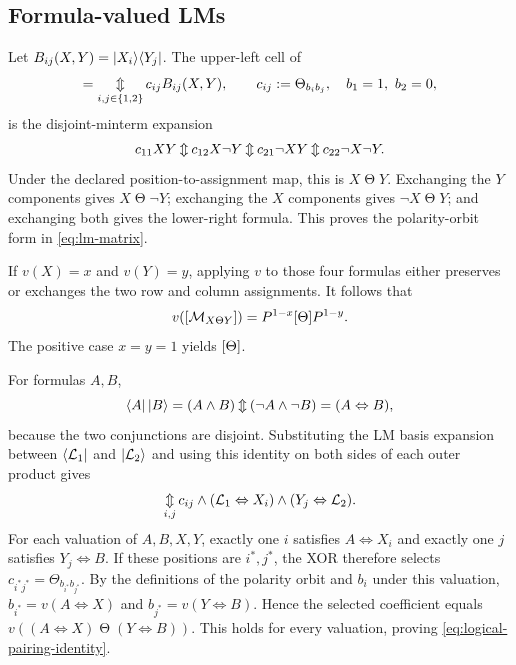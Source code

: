 \subsection{Formula-valued LMs}

Let $B_{ij}(X,Y)=\left|X_i\right\rangle\!\left\langle Y_j\right|$. The upper-left cell of
\begin{equation}
  [\mathcal{M}_{X\Theta Y}]
  =\mathop{\XOR}_{i,j\in\{1,2\}}c_{ij}B_{ij}(X,Y),
  \qquad c_{ij}:=\Theta_{b_i b_j},\quad b_1=1,\ b_2=0,
\end{equation}
is the disjoint-minterm expansion
\begin{equation}
  c_{11}XY
  \mathbin{\Updownarrow} c_{12}X\neg Y
  \mathbin{\Updownarrow} c_{21}\neg X Y
  \mathbin{\Updownarrow} c_{22}\neg X\neg Y.
\end{equation}
Under the declared position-to-assignment map, this is
$X\mathbin{\Theta}Y$. Exchanging the $Y$ components gives
$X\mathbin{\Theta}\neg Y$; exchanging the $X$ components gives
$\neg X\mathbin{\Theta}Y$; and exchanging both gives the lower-right
formula. This proves the polarity-orbit form in \eqref{eq:lm-matrix}.

If $v(X)=x$ and $v(Y)=y$, applying $v$ to those four formulas either preserves
or exchanges the two row and column assignments. It follows that
\begin{equation}
  v([\mathcal{M}_{X\Theta Y}])
  =P^{1-x}[\Theta]P^{1-y}.
\end{equation}
The positive case $x=y=1$ yields $[\Theta]$.

For formulas $A,B$,
\begin{equation}
  \left\langle A\right|\left|B\right\rangle
  =(A\wedge B)\mathbin{\Updownarrow}(\neg A\wedge\neg B)
  =(A\Leftrightarrow B),
\end{equation}
because the two conjunctions are disjoint. Substituting the LM basis expansion
between $\left\langle\mathcal L_1\right|$ and $\left|\mathcal L_2\right\rangle$ and using this
identity on both sides of each outer product gives
\begin{equation}
  \mathop{\mathbin{\Updownarrow}}_{i,j}
    c_{ij}\wedge(\mathcal L_1\Leftrightarrow X_i)
    \wedge(Y_j\Leftrightarrow\mathcal L_2).
\end{equation}
For each valuation of $A,B,X,Y$, exactly one $i$ satisfies
$A\Leftrightarrow X_i$ and exactly one $j$ satisfies
$Y_j\Leftrightarrow B$. If these positions are $i^*,j^*$, the XOR therefore
selects $c_{i^*j^*}=\Theta_{b_{i^*}b_{j^*}}$. By the definitions of the
polarity orbit and $b_i$ under this valuation,
$b_{i^*}=v(A\Leftrightarrow X)$ and
$b_{j^*}=v(Y\Leftrightarrow B)$. Hence the selected coefficient equals
$v((A\Leftrightarrow X)\mathbin{\Theta}(Y\Leftrightarrow B))$. This holds for
every valuation, proving \eqref{eq:logical-pairing-identity}.

